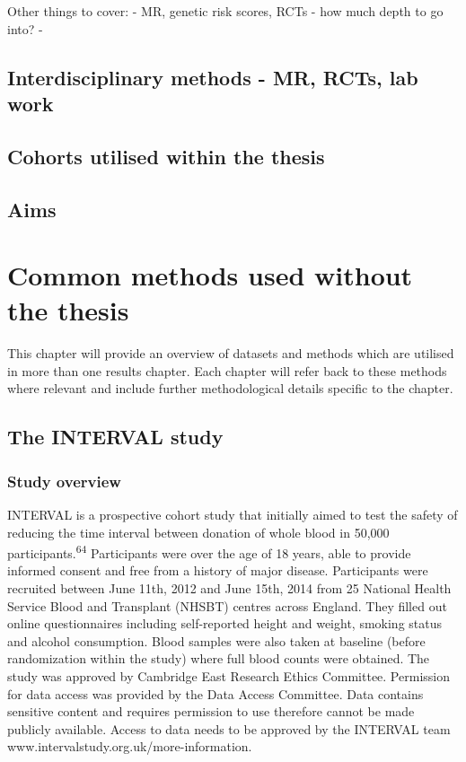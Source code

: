 \documentclass[11pt,twoside]{bristolthesis}
\begin{document}
Other things to cover:
- MR, genetic risk scores, RCTs - how much depth to go into?
-

\hypertarget{interdisciplinary-methods---mr-rcts-lab-work}{%
\section{Interdisciplinary methods - MR, RCTs, lab work}\label{interdisciplinary-methods---mr-rcts-lab-work}}

\hypertarget{cohorts-utilised-within-the-thesis}{%
\section{Cohorts utilised within the thesis}\label{cohorts-utilised-within-the-thesis}}

\hypertarget{aims}{%
\section{Aims}\label{aims}}

\hypertarget{common-methods}{%
\chapter{Common methods used without the thesis}\label{common-methods}}

This chapter will provide an overview of datasets and methods which are utilised in more than one results chapter. Each chapter will refer back to these methods where relevant and include further methodological details specific to the chapter.

\hypertarget{the-interval-study}{%
\section{The INTERVAL study}\label{the-interval-study}}

\hypertarget{study-overview}{%
\subsection{Study overview}\label{study-overview}}

INTERVAL is a prospective cohort study that initially aimed to test the safety of reducing the time interval between donation of whole blood in 50,000 participants.\textsuperscript{64} Participants were over the age of 18 years, able to provide informed consent and free from a history of major disease. Participants were recruited between June 11th, 2012 and June 15th, 2014 from 25 National Health Service Blood and Transplant (NHSBT) centres across England. They filled out online questionnaires including self-reported height and weight, smoking status and alcohol consumption. Blood samples were also taken at baseline (before randomization within the study) where full blood counts were obtained. The study was approved by Cambridge East Research Ethics Committee. Permission for data access was provided by the Data Access Committee. Data contains sensitive content and requires permission to use therefore cannot be made publicly available. Access to data needs to be approved by the INTERVAL team www.intervalstudy.org.uk/more-information.
\end{document}
